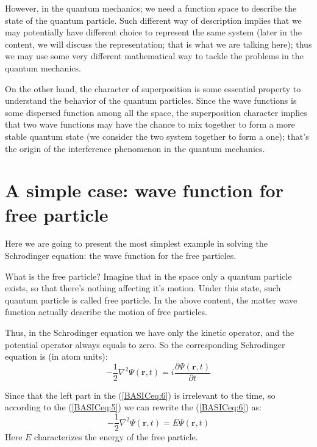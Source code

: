 However, in the quantum mechanics; we need a function space to
describe the state of the quantum particle. Such different way of
description implies that we may potentially have different choice to
represent the same system (later in the content, we will discuss the
representation; that is what we are talking here); thus we may use
some very different mathematical way to tackle the problems in the
quantum mechanics.

On the other hand, the character of superposition is some essential
property to understand the behavior of the quantum particles. Since
the wave functions is some dispersed function among all the space,
the superposition character implies that two wave functions may have
the chance to mix together to form a more stable quantum state (we
consider the two system together to form a one); that's the origin
of the interference phenomenon in the quantum mechanics.

\section{A simple case: wave function for free particle}
\label{ASCWFFFP_in_basic}
%
%
%
%
Here we are going to present the most simplest example in solving
the Schrodinger equation: the wave function for the free particles.

What is the free particle? Imagine that in the space only a quantum
particle exists, so that there's nothing affecting it's motion.
Under this state, such quantum particle is called free particle. In
the above content, the matter wave function actually describe the
motion of free particles.

Thus, in the Schrodinger equation we have only the kinetic operator,
and the potential operator always equals to zero. So the corresponding
Schrodinger equation is (in atom units):
\begin{equation}
  \label{BASICeq:6}
  -\frac{1}{2}\nabla^{2}\Psi(\bm{r},t) = i \frac{\partial
\Psi(\bm{r},t)}{\partial t}
\end{equation}

Since that the left part in the (\ref{BASICeq:6}) is irrelevant to the
time, so according to the (\ref{BASICeq:5}) we can rewrite the
(\ref{BASICeq:6}) as:
\begin{equation}
  \label{BASICeq:11}
    -\frac{1}{2}\nabla^{2}\Psi(\bm{r},t) = E \Psi(\bm{r},t)
\end{equation}
Here $E$ characterizes the energy of the free particle.

